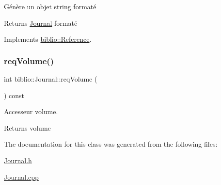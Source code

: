 Génère un objet string formaté 

\begin{DoxyReturn}{Returns}
\hyperlink{classbiblio_1_1Journal}{Journal} formaté 
\end{DoxyReturn}


Implements \hyperlink{classbiblio_1_1Reference}{biblio\+::\+Reference}.

\mbox{\label{classbiblio_1_1Journal_a531b7b5c9b2a751c5cc13708bd162686}} 
\subsubsection{\texorpdfstring{req\+Volume()}{reqVolume()}}
{\footnotesize\ttfamily int biblio\+::\+Journal\+::req\+Volume (\begin{DoxyParamCaption}{ }\end{DoxyParamCaption}) const\hspace{0.3cm}{\ttfamily [inline]}}



Accesseur volume. 

\begin{DoxyReturn}{Returns}
volume 
\end{DoxyReturn}


The documentation for this class was generated from the following files\+:\begin{DoxyCompactItemize}
\item 
\hyperlink{Journal_8h}{Journal.\+h}\item 
\hyperlink{Journal_8cpp}{Journal.\+cpp}\end{DoxyCompactItemize}
